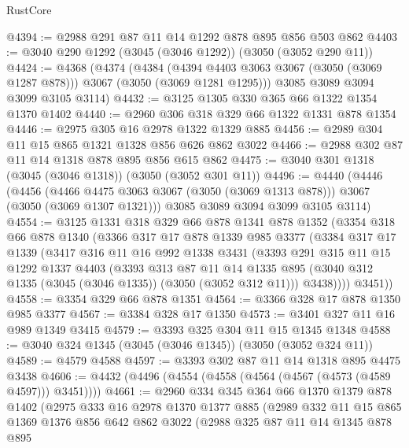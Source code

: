 \begin{lexlean}{RustCore}
\begin{coremodule}
@4394 := @2988 @291 @87 @11 @14 @1292 @878 @895 @856 @503 @862
@4403 := @3040 @290 @1292 (@3045 (@3046 @1292)) (@3050 (@3052 @290 @11))
@4424 := @4368
    (@4374
      (@4384 (@4394 @4403 @3063 @3067 (@3050 (@3069 @1287 @878))) @3067 (@3050 (@3069 @1281 @1295)))
      @3085
      @3089
      @3094
      @3099
      @3105
      @3114)
@4432 := @3125 @1305 @330 @365 @66 @1322 @1354 @1370 @1402
@4440 := @2960 @306 @318 @329 @66 @1322 @1331 @878 @1354
@4446 := @2975 @305 @16 @2978 @1322 @1329 @885
@4456 := @2989 @304 @11 @15 @865 @1321 @1328 @856 @626 @862 @3022
@4466 := @2988 @302 @87 @11 @14 @1318 @878 @895 @856 @615 @862
@4475 := @3040 @301 @1318 (@3045 (@3046 @1318)) (@3050 (@3052 @301 @11))
@4496 := @4440
    (@4446
      (@4456 (@4466 @4475 @3063 @3067 (@3050 (@3069 @1313 @878))) @3067 (@3050 (@3069 @1307 @1321)))
      @3085
      @3089
      @3094
      @3099
      @3105
      @3114)
@4554 := @3125
    @1331
    @318
    @329
    @66
    @878
    @1341
    @878
    @1352
    (@3354
      @318
      @66
      @878
      @1340
      (@3366
        @317
        @17
        @878
        @1339
        @985
        @3377
        (@3384
          @317
          @17
          @1339
          (@3417
            @316
            @11
            @16
            @992
            @1338
            @3431
            (@3393
              @291
              @315
              @11
              @15
              @1292
              @1337
              @4403
              (@3393
                @313
                @87
                @11
                @14
                @1335
                @895
                (@3040 @312 @1335 (@3045 (@3046 @1335)) (@3050 (@3052 @312 @11)))
                @3438))))
        @3451))
@4558 := @3354 @329 @66 @878 @1351
@4564 := @3366 @328 @17 @878 @1350 @985 @3377
@4567 := @3384 @328 @17 @1350
@4573 := @3401 @327 @11 @16 @989 @1349 @3415
@4579 := @3393 @325 @304 @11 @15 @1345 @1348
@4588 := @3040 @324 @1345 (@3045 (@3046 @1345)) (@3050 (@3052 @324 @11))
@4589 := @4579 @4588
@4597 := @3393 @302 @87 @11 @14 @1318 @895 @4475 @3438
@4606 := @4432 (@4496 (@4554 (@4558 (@4564 (@4567 (@4573 (@4589 @4597))) @3451))))
@4661 := @2960
    @334
    @345
    @364
    @66
    @1370
    @1379
    @878
    @1402
    (@2975
      @333
      @16
      @2978
      @1370
      @1377
      @885
      (@2989
        @332
        @11
        @15
        @865
        @1369
        @1376
        @856
        @642
        @862
        @3022
        (@2988
          @325
          @87
          @11
          @14
          @1345
          @878
          @895

\end{coremodule}
\end{lexlean}
